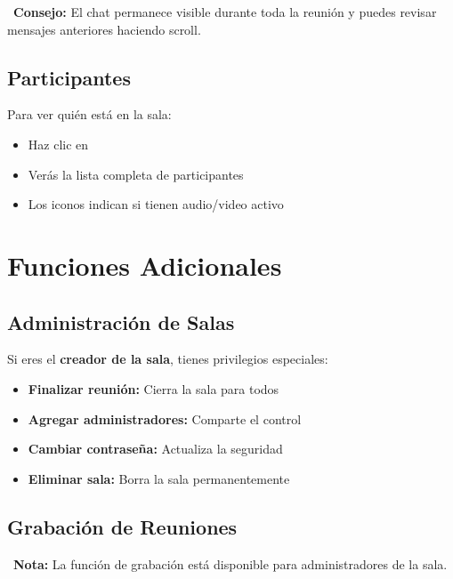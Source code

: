 \documentclass[11pt,a4paper]{article}
\begin{document}
\begin{tipbox}
    \faLightbulb\ \textbf{Consejo:} El chat permanece visible durante toda la reunión y puedes revisar mensajes anteriores haciendo scroll.
\end{tipbox}

\subsection{Participantes}

Para ver quién está en la sala:
\begin{itemize}
    \item Haz clic en \textcolor{charlatonCyan}{\faUsers}
    \item Verás la lista completa de participantes
    \item Los iconos indican si tienen audio/video activo
\end{itemize}

\section{Funciones Adicionales \faStar}

\subsection{Administración de Salas}

Si eres el \textbf{creador de la sala}, tienes privilegios especiales:

\begin{itemize}[leftmargin=2cm]
    \item[\color{charlatonBlue}\faCrown] \textbf{Finalizar reunión:} Cierra la sala para todos
    \item[\color{charlatonCyan}\faUserPlus] \textbf{Agregar administradores:} Comparte el control
    \item[\color{charlatonOrange}\faKey] \textbf{Cambiar contraseña:} Actualiza la seguridad
    \item[\color{charlatonBlue}\faTrash] \textbf{Eliminar sala:} Borra la sala permanentemente
\end{itemize}

\subsection{Grabación de Reuniones}

\begin{warningbox}
    \faExclamationTriangle\ \textbf{Nota:} La función de grabación está disponible para administradores de la sala.
\end{warningbox}
\end{document}
